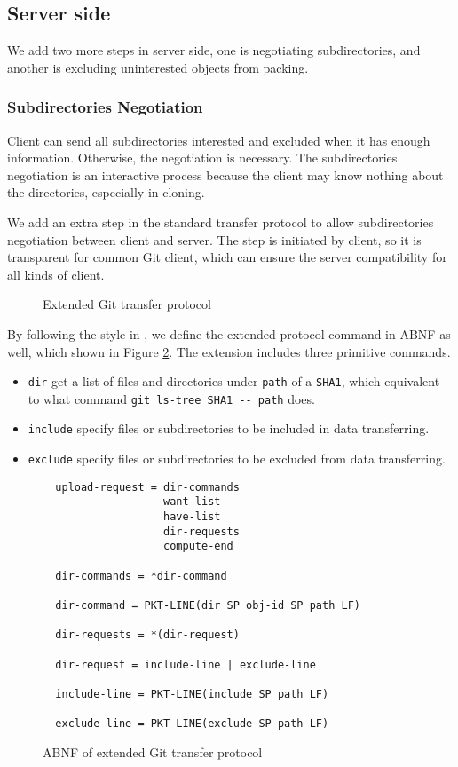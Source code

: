 \documentclass[preprint]{sigplanconf}
\begin{document}
\subsection{Server side}
We add two more steps in server side, one is negotiating subdirectories,
and another is excluding uninterested objects from packing.
\subsubsection{Subdirectories Negotiation}
Client can send all subdirectories interested and excluded when it has enough
information.
Otherwise, the negotiation is necessary.
The subdirectories negotiation is an interactive process because the client may
know nothing about the directories, especially in cloning.

We add an extra step in the standard transfer protocol to allow subdirectories
negotiation between client and server.
The step is initiated by client, so it is transparent for common Git client,
which can ensure the server compatibility for all kinds of client.
\begin{figure}[htpb]
  \centering
  
  \caption{Extended Git transfer protocol}
  \label{fig:git-proto-ext-seq}
\end{figure}

By following the style in \cite{tran-protocol}, we define the extended
protocol command in ABNF as well, which shown in Figure
\ref{fig:git-proto-ext-ABNF}.
The extension includes three primitive commands.
\begin{itemize}
  \item \verb|dir| get a list of files and directories under \verb|path| of a
    \verb|SHA1|, which equivalent to what command
    \verb|git ls-tree SHA1 -- path| does.

  \item \verb|include| specify files or subdirectories to be included in data
    transferring.

  \item \verb|exclude| specify files or subdirectories to be excluded from data
    transferring.
\end{itemize}

\begin{figure}[htpb]
  \centering
  \begin{verbatim}
  upload-request = dir-commands
                   want-list
                   have-list
                   dir-requests
                   compute-end

  dir-commands = *dir-command

  dir-command = PKT-LINE(dir SP obj-id SP path LF)

  dir-requests = *(dir-request)

  dir-request = include-line | exclude-line

  include-line = PKT-LINE(include SP path LF)

  exclude-line = PKT-LINE(exclude SP path LF)
  \end{verbatim}
  \caption{ABNF of extended Git transfer protocol}
  \label{fig:git-proto-ext-ABNF}
\end{figure}
\end{document}
